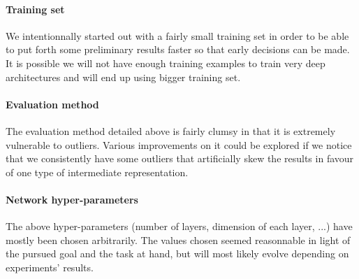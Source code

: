 \documentclass[conference]{IEEEtran}
\begin{document}
\paragraph{Training set}

We intentionnally started out with a fairly small training set in order to be
able to put forth some preliminary results faster so that early decisions can be
made. It is possible we will not have enough training examples to train very
deep architectures and will end up using bigger training set.

\paragraph{Evaluation method}

The evaluation method detailed above is fairly clumsy in that it is extremely
vulnerable to outliers. Various improvements on it could be explored if we
notice that we consistently have some outliers that artificially skew the
results in favour of one type of intermediate representation.

\paragraph{Network hyper-parameters}

The above hyper-parameters (number of layers, dimension of each layer, ...) have
mostly been chosen arbitrarily. The values chosen seemed reasonnable in light of
the pursued goal and the task at hand, but will most likely evolve depending on
experiments' results.

\appendix

\printbibliography
\end{document}

